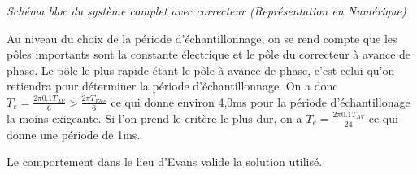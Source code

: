 \documentclass[11pt, french]{article} %
\begin{document}
\begin{center}

\emph{Schéma bloc du système complet avec correcteur (Représentation en Numérique)}
\end{center}

Au niveau du choix de la période d'échantillonnage, on se rend compte que les pôles importants sont la constante électrique et le pôle du correcteur à avance de phase. Le pôle le plus rapide étant le pôle à avance de phase, c'est celui qu'on retiendra pour déterminer la période d'échantillonnage. On a donc $T_e=\frac{2 \pi 0.1 T_{AV}}{6} > \frac{2 \pi T_{Elec}}{6}$ ce qui donne environ 4,0ms pour la période d'échantillonage la moins exigeante. Si l'on prend le critère le plus dur, on a $T_e=\frac{2 \pi 0.1 T_{AV}}{24}$ ce qui donne une période de 1ms. 

Le comportement dans le lieu d'Evans valide la solution utilisé.
\end{document}
